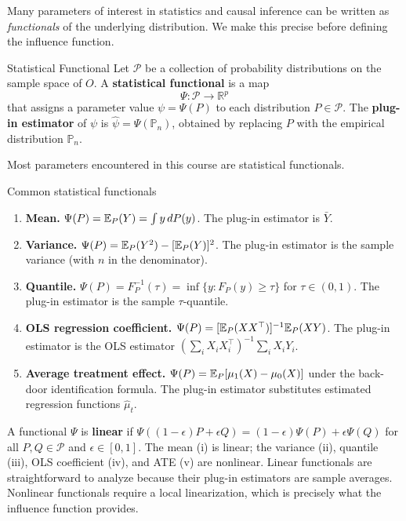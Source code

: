 \documentclass[master.tex]{subfiles}
\begin{document}
Many parameters of interest in statistics and causal inference can be
written as \emph{functionals} of the underlying distribution.  We make
this precise before defining the influence function.

\begin{defn}{Statistical Functional}
\label{w9:defn:functional}
Let $\mathcal{P}$ be a collection of probability distributions on the
sample space of $O$.  A \textbf{statistical functional} is a map
\[
  \Psi : \mathcal{P} \longrightarrow \mathbb{R}^p
\]
that assigns a parameter value $\psi = \Psi(P)$ to each distribution
$P \in \mathcal{P}$.  The \textbf{plug-in estimator} of $\psi$ is
$\hat\psi = \Psi(\mathbb{P}_n)$, obtained by replacing $P$ with the
empirical distribution $\mathbb{P}_n$.
\end{defn}

Most parameters encountered in this course are statistical functionals.

\begin{example}{Common statistical functionals}
\label{w9:ex:functionals}
\begin{enumerate}[label=(\roman*)]
  \item \textbf{Mean.}
    $\Psi(P) = \mathbb{E}_P(Y) = \int y\,dP(y)$.
    The plug-in estimator is $\bar Y$.
  \item \textbf{Variance.}
    $\Psi(P) = \mathbb{E}_P(Y^2) - [\mathbb{E}_P(Y)]^2$.
    The plug-in estimator is the sample variance (with $n$ in the
    denominator).
  \item \textbf{Quantile.}
    $\Psi(P) = F_P^{-1}(\tau) = \inf\{y : F_P(y) \geq \tau\}$ for
    $\tau \in (0,1)$.  The plug-in estimator is the sample
    $\tau$-quantile.
  \item \textbf{OLS regression coefficient.}
    $\Psi(P) = [\mathbb{E}_P(XX^\top)]^{-1}\mathbb{E}_P(XY)$.
    The plug-in estimator is the OLS estimator
    $(\sum_i X_iX_i^\top)^{-1}\sum_i X_iY_i$.
  \item \textbf{Average treatment effect.}
    $\Psi(P) = \mathbb{E}_P[\mu_1(X) - \mu_0(X)]$ under the back-door
    identification formula.  The plug-in estimator substitutes
    estimated regression functions $\hat\mu_t$.
\end{enumerate}
\end{example}

\begin{remark}
\label{w9:rem:linear-functional}
A functional $\Psi$ is \textbf{linear} if
$\Psi((1-\epsilon)P + \epsilon Q) = (1-\epsilon)\Psi(P) +
\epsilon\Psi(Q)$ for all $P, Q \in \mathcal{P}$ and
$\epsilon \in [0,1]$.  The mean (i) is linear; the variance (ii),
quantile (iii), OLS coefficient (iv), and ATE (v) are nonlinear.
Linear functionals are straightforward to analyze because their
plug-in estimators are sample averages.  Nonlinear functionals require
a local linearization, which is precisely what the influence function
provides.
\end{remark}
\end{document}
